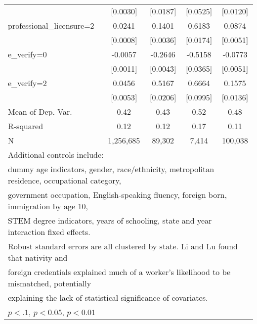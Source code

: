 \begin{table}[htbp]
\begin{tabular}{l*{4}{c}}
                    &    [0.0030]         &    [0.0187]         &    [0.0525]         &    [0.0120]         \\
\addlinespace
professional\_licensure=2&      0.0241\sym{***}&      0.1401\sym{***}&      0.6183\sym{***}&      0.0874\sym{***}\\
                    &    [0.0008]         &    [0.0036]         &    [0.0174]         &    [0.0051]         \\
\addlinespace
e\_verify=0          &     -0.0057\sym{***}&     -0.2646\sym{***}&     -0.5158\sym{***}&     -0.0773\sym{***}\\
                    &    [0.0011]         &    [0.0043]         &    [0.0365]         &    [0.0051]         \\
\addlinespace
e\_verify=2          &      0.0456\sym{***}&      0.5167\sym{***}&      0.6664\sym{***}&      0.1575\sym{***}\\
                    &    [0.0053]         &    [0.0206]         &    [0.0995]         &    [0.0136]         \\
\midrule
Mean of Dep. Var.   &        0.42         &        0.43         &        0.52         &        0.48         \\
R-squared           &        0.12         &        0.12         &        0.17         &        0.11         \\
N                   &   1,256,685         &      89,302         &       7,414         &     100,038         \\
\bottomrule
\multicolumn{5}{l}{\footnotesize Additional controls include:}\\
\multicolumn{5}{l}{\footnotesize dummy age indicators, gender, race/ethnicity, metropolitan residence, occupational category,}\\
\multicolumn{5}{l}{\footnotesize government occupation, English-speaking fluency, foreign born, immigration by age 10,}\\
\multicolumn{5}{l}{\footnotesize STEM degree indicators, years of schooling, state and year interaction fixed effects.}\\
\multicolumn{5}{l}{\footnotesize Robust standard errors are all clustered by state. Li and Lu found that nativity and}\\
\multicolumn{5}{l}{\footnotesize foreign credentials explained much of a worker's likelihood to be mismatched, potentially}\\
\multicolumn{5}{l}{\footnotesize explaining the lack of statistical significance of covariates.}\\
\multicolumn{5}{l}{\footnotesize \sym{*} \(p<.1\), \sym{**} \(p<0.05\), \sym{***} \(p<0.01\)}\\
\end{tabular}
\end{table}
